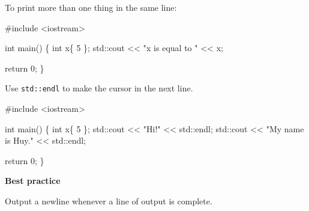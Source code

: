 \documentclass[
  letterpaper,
  DIV=11,
  numbers=noendperiod]{scrreprt}
\newenvironment{Shaded}{\begin{snugshade}}{\end{snugshade}}
\newcommand{\CommentTok}[1]{\textcolor[rgb]{0.37,0.37,0.37}{#1}}
\newcommand{\DecValTok}[1]{\textcolor[rgb]{0.68,0.00,0.00}{#1}}
\newcommand{\ErrorTok}[1]{\textcolor[rgb]{0.68,0.00,0.00}{#1}}
\newcommand{\FunctionTok}[1]{\textcolor[rgb]{0.28,0.35,0.67}{#1}}
\newcommand{\NormalTok}[1]{\textcolor[rgb]{0.00,0.23,0.31}{#1}}
\newcommand{\SpecialCharTok}[1]{\textcolor[rgb]{0.37,0.37,0.37}{#1}}
\newcommand{\StringTok}[1]{\textcolor[rgb]{0.13,0.47,0.30}{#1}}
\begin{document}
To print more than one thing in the same line:

\begin{Shaded}
\begin{Highlighting}[]
\CommentTok{\#include \textless{}iostream\textgreater{}}

\NormalTok{int }\FunctionTok{main}\NormalTok{()}
\NormalTok{\{}
\NormalTok{    int x\{ }\DecValTok{5}\NormalTok{ \};}
\NormalTok{    std}\SpecialCharTok{::}\NormalTok{cout }\SpecialCharTok{\textless{}}\ErrorTok{\textless{}} \StringTok{"x is equal to "} \SpecialCharTok{\textless{}}\ErrorTok{\textless{}}\NormalTok{ x;}

\NormalTok{    return }\DecValTok{0}\NormalTok{;}
\NormalTok{\}}
\end{Highlighting}
\end{Shaded}

Use \texttt{std::endl} to make the cursor in the next line.

\begin{Shaded}
\begin{Highlighting}[]
\CommentTok{\#include \textless{}iostream\textgreater{}}

\NormalTok{int }\FunctionTok{main}\NormalTok{()}
\NormalTok{\{}
\NormalTok{    int x\{ }\DecValTok{5}\NormalTok{ \};}
\NormalTok{    std}\SpecialCharTok{::}\NormalTok{cout }\SpecialCharTok{\textless{}}\ErrorTok{\textless{}} \StringTok{"Hi!"} \SpecialCharTok{\textless{}}\ErrorTok{\textless{}}\NormalTok{ std}\SpecialCharTok{::}\NormalTok{endl;}
\NormalTok{    std}\SpecialCharTok{::}\NormalTok{cout }\SpecialCharTok{\textless{}}\ErrorTok{\textless{}} \StringTok{"My name is Huy."} \SpecialCharTok{\textless{}}\ErrorTok{\textless{}}\NormalTok{ std}\SpecialCharTok{::}\NormalTok{endl;}

\NormalTok{    return }\DecValTok{0}\NormalTok{;}
\NormalTok{\}}
\end{Highlighting}
\end{Shaded}

\begin{tcolorbox}[enhanced jigsaw, toprule=.15mm, rightrule=.15mm, opacityback=0, breakable, leftrule=.75mm, colback=white, colframe=quarto-callout-tip-color-frame, arc=.35mm, left=2mm, bottomrule=.15mm]
\begin{minipage}[t]{5.5mm}
\textcolor{quarto-callout-tip-color}{\faLightbulb}
\end{minipage}%
\begin{minipage}[t]{\textwidth - 5.5mm}

\textbf{Best practice}\vspace{2mm}

Output a newline whenever a line of output is complete.

\end{minipage}%
\end{tcolorbox}
\end{document}
